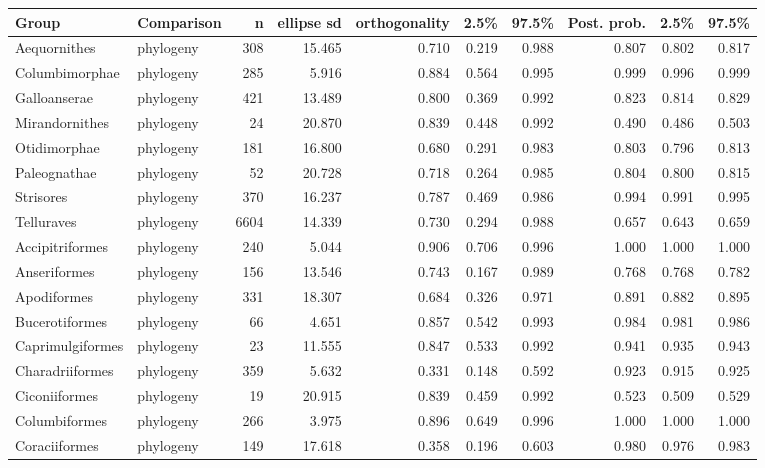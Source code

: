 \begin{table}[ht]
\centering
\begin{tabular}{llrrrrrrrr}
  \hline
Group & Comparison & n & ellipse sd & orthogonality & 2.5\% & 97.5\% & Post. prob. & 2.5\% & 97.5\% \\ 
  \hline
Aequornithes & phylogeny &  308 & 15.465 & 0.710 & 0.219 & 0.988 & 0.807 & 0.802 & 0.817 \\ 
  Columbimorphae & phylogeny &  285 & 5.916 & 0.884 & 0.564 & 0.995 & 0.999 & 0.996 & 0.999 \\ 
  Galloanserae & phylogeny &  421 & 13.489 & 0.800 & 0.369 & 0.992 & 0.823 & 0.814 & 0.829 \\ 
  Mirandornithes & phylogeny &   24 & 20.870 & 0.839 & 0.448 & 0.992 & 0.490 & 0.486 & 0.503 \\ 
  Otidimorphae & phylogeny &  181 & 16.800 & 0.680 & 0.291 & 0.983 & 0.803 & 0.796 & 0.813 \\ 
  Paleognathae & phylogeny &   52 & 20.728 & 0.718 & 0.264 & 0.985 & 0.804 & 0.800 & 0.815 \\ 
  Strisores & phylogeny &  370 & 16.237 & 0.787 & 0.469 & 0.986 & 0.994 & 0.991 & 0.995 \\ 
  Telluraves & phylogeny & 6604 & 14.339 & 0.730 & 0.294 & 0.988 & 0.657 & 0.643 & 0.659 \\ 
  Accipitriformes & phylogeny &  240 & 5.044 & 0.906 & 0.706 & 0.996 & 1.000 & 1.000 & 1.000 \\ 
  Anseriformes & phylogeny &  156 & 13.546 & 0.743 & 0.167 & 0.989 & 0.768 & 0.768 & 0.782 \\ 
  Apodiformes & phylogeny &  331 & 18.307 & 0.684 & 0.326 & 0.971 & 0.891 & 0.882 & 0.895 \\ 
  Bucerotiformes & phylogeny &   66 & 4.651 & 0.857 & 0.542 & 0.993 & 0.984 & 0.981 & 0.986 \\ 
  Caprimulgiformes & phylogeny &   23 & 11.555 & 0.847 & 0.533 & 0.992 & 0.941 & 0.935 & 0.943 \\ 
  Charadriiformes & phylogeny &  359 & 5.632 & 0.331 & 0.148 & 0.592 & 0.923 & 0.915 & 0.925 \\ 
  Ciconiiformes & phylogeny &   19 & 20.915 & 0.839 & 0.459 & 0.992 & 0.523 & 0.509 & 0.529 \\ 
  Columbiformes & phylogeny &  266 & 3.975 & 0.896 & 0.649 & 0.996 & 1.000 & 1.000 & 1.000 \\ 
  Coraciiformes & phylogeny &  149 & 17.618 & 0.358 & 0.196 & 0.603 & 0.980 & 0.976 & 0.983 \\ 

\end{tabular}
\end{table}
